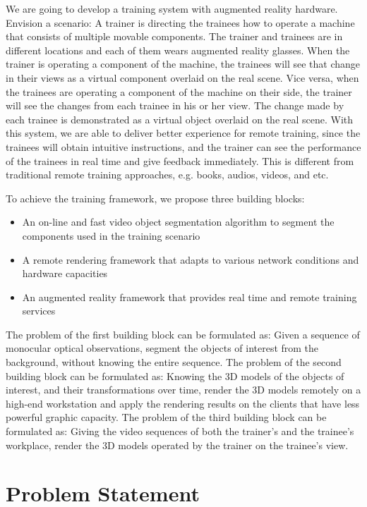 We are going to develop a training system with augmented reality hardware. Envision a scenario: A trainer is directing the trainees how to operate a machine that consists of multiple movable components.
The trainer and trainees are in different locations and each of them wears augmented reality glasses. When the trainer is operating a component of the machine, the trainees will see that change in their views as a virtual component overlaid on the real scene.
Vice versa, when the trainees are operating a component of the machine on their side, the trainer will see the changes from each trainee in his or her view. The change made by each trainee is demonstrated as a virtual object overlaid on the real scene.
With this system, we are able to deliver better experience for remote training, since the trainees will obtain intuitive instructions, and the trainer can see the performance of the trainees in real time and give feedback immediately. This is different from traditional remote training approaches, e.g. books, audios, videos, and etc.

To achieve the training framework, we propose three building blocks:

\begin{itemize}
  \item
  An on-line and fast video object segmentation algorithm to segment the components used in the training scenario
  \item
  A remote rendering framework that adapts to various network conditions and hardware capacities
  \item
  An augmented reality framework that provides real time and remote training services
\end{itemize}

The problem of the first building block can be formulated as: Given a sequence of monocular optical observations, segment the objects of interest from the background, without knowing the entire sequence. The problem of the second building block can be formulated as: Knowing the 3D models of the objects of interest, and their transformations over time, render the 3D models remotely on a high-end workstation and apply the rendering results on the clients that have less powerful graphic capacity.  The problem of the third building block can be formulated as: Giving the video sequences of both the trainer's and the trainee's workplace, render the 3D models operated by the trainer on the trainee's view.

\section{Problem Statement}

